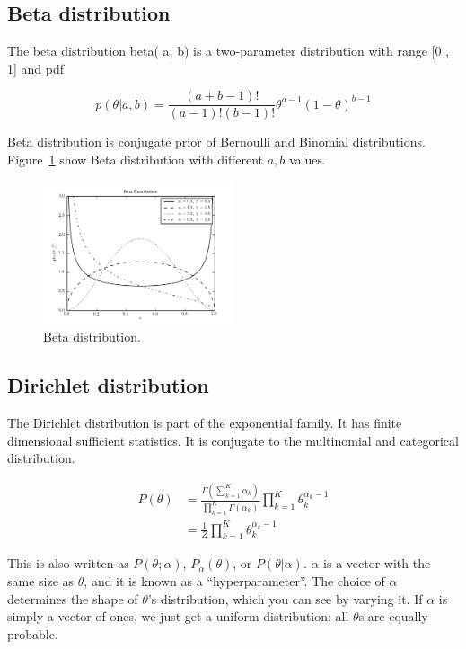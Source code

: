 \subsection*{Beta distribution}
The beta distribution beta( a, b) is a two-parameter distribution with range [0 , 1] and pdf

\begin{equation}
	p(\theta | a,b) = \frac{(a + b - 1)! }{(a -1 )!(b - 1)!}\theta^{a -1} (1 - \theta)^{b - 1}
\end{equation}

Beta distribution is conjugate prior of Bernoulli and Binomial distributions. Figure~\ref{fig:beta} show Beta distribution with different $a,b$ values.

\begin{figure}[htp]
\centering
\includegraphics[width=0.5\textwidth]{images/fig_beta_distribution_1.png}
\caption{Beta distribution. \cite{astroMLText}}
\label{fig:beta}
\end{figure}



\subsection*{Dirichlet distribution}
The Dirichlet distribution is part of the exponential family. It has finite dimensional sufficient statistics. It is conjugate to the multinomial and categorical distribution. 


\begin{align*}
    P(\theta) &= \frac{\Gamma(\sum_{k=1}^K \alpha_k)}{\prod_{k=1}^K \Gamma(\alpha_k)}\prod_{k=1}^K \theta_k^{\alpha_k-1} \\
			  &= \frac{1}{Z} \prod_{k=1}^K \theta_k^{\alpha_k-1}
\end{align*}

This is also written as $P(\theta;\alpha)$, $P_\alpha(\theta)$, or $P(\theta|\alpha)$. $\alpha$ is a vector with the same size as $\theta$, and it is known as a ``hyperparameter''.  The choice of $\alpha$ determines the shape of $\theta$'s distribution, which you can see by varying it.  If $\alpha$ is simply a vector of ones, we just get a uniform distribution; all $\theta$s are equally probable.


